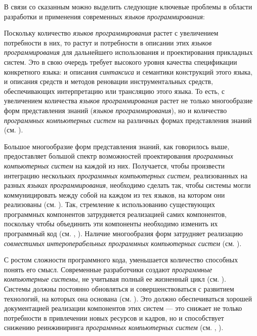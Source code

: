 В связи со сказанным можно выделить следующие ключевые проблемы в области разработки и применения современных \textit{языков программирования}:
\begin{textitemize}
    \item Поскольку количество \textit{языков программирования} растет с увеличением потребности в них, то растут и потребности в описании этих \textit{языков программирования} для дальнейшего использования и проектирования прикладных систем. Это в свою очередь требует высокого уровня качества спецификации конкретного языка: и описания \textit{синтаксиса} и семантики конструкций этого языка, и описания средств и методов реновации инструментальных средств, обеспечивающих интерпретацию или трансляцию этого языка. То есть, с увеличением количества \textit{языков программирования} растет не только многообразие форм представления знаний (\textit{языков программирования}), но и количество \textit{программных компьютерных систем} на различных формах представления знаний (см. ).
    \item Большое многообразие форм представления знаний, как говорилось выше, предоставляет большой спектр возможностей проектирования \textit{программных компьютерных систем} на каждой из них. Получается, чтобы произвести интеграцию нескольких \textit{программных компьютерных систем}, реализованных на разных \textit{языках программирования}, необходимо сделать так, чтобы системы могли коммуницировать между собой на каждом из тех языков, на котором они реализованы (см. ). Так, стремление к использованию существующих программных компонентов затрудняется реализацией самих компонентов, поскольку чтобы объединить эти компоненты необходимо изменить их программный код (см. , ). Наличие многообразия форм затрудняет реализацию \textit{совместимых интероперабельных программных компьютерных систем} (см. ).
    \item С ростом сложности программного кода, уменьшается количество способных понять его смысл. Современные разработчики создают \textit{программные компьютерные системы}, не учитывая полный ее жизненный цикл (см. ). Системы должны постоянно обновляться и совершенствоваться с развитием технологий, на которых она основана (см. ). Это должно обеспечиваться хорошей документацией реализации компонентов этих систем --- это снижает не только потребности в привлечении новых ресурсов и кадров, но и способствует снижению реинжиниринга \textit{программных компьютерных систем} (см. , ).

\end{textitemize}
